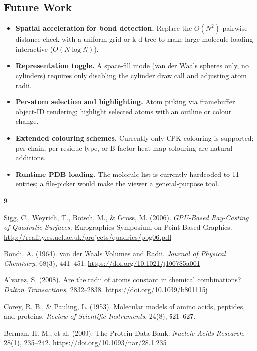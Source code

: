 \documentclass[12pt, a4paper]{article}
\begin{document}
\subsection{Future Work}

\begin{itemize}
    \item \textbf{Spatial acceleration for bond detection.} Replace the $O(N^2)$ pairwise 
    distance check with a uniform grid or k-d tree to make large-molecule loading 
    interactive ($O(N \log N)$).
    \item \textbf{Representation toggle.} A space-fill mode (van der Waals spheres only, 
    no cylinders) requires only disabling the cylinder draw call and adjusting atom radii.
    \item \textbf{Per-atom selection and highlighting.} Atom picking via framebuffer 
    object-ID rendering; highlight selected atoms with an outline or colour change.
    \item \textbf{Extended colouring schemes.} Currently only CPK colouring is supported; 
    per-chain, per-residue-type, or B-factor heat-map colouring are natural additions.
    \item \textbf{Runtime PDB loading.} The molecule list is currently hardcoded to 11 
    entries; a file-picker would make the viewer a general-purpose tool.
\end{itemize} 
\clearpage
\begin{thebibliography}{9}

Sigg, C., Weyrich, T., Botsch, M., \& Gross, M. (2006).
\textit{GPU-Based Ray-Casting of Quadratic Surfaces.}
Eurographics Symposium on Point-Based Graphics.
\url{http://reality.cs.ucl.ac.uk/projects/quadrics/pbg06.pdf}

Bondi, A. (1964).
van der Waals Volumes and Radii.
\textit{Journal of Physical Chemistry}, 68(3), 441--451.
\url{https://doi.org/10.1021/j100785a001}

Alvarez, S. (2008).
Are the radii of atoms constant in chemical combinations?
\textit{Dalton Transactions}, 2832--2838.
\url{https://doi.org/10.1039/b801115j}

Corey, R. B., \& Pauling, L. (1953).
Molecular models of amino acids, peptides, and proteins.
\textit{Review of Scientific Instruments}, 24(8), 621--627.

Berman, H. M., et al. (2000).
The Protein Data Bank.
\textit{Nucleic Acids Research}, 28(1), 235--242.
\url{https://doi.org/10.1093/nar/28.1.235}

\end{thebibliography}
\end{document}
